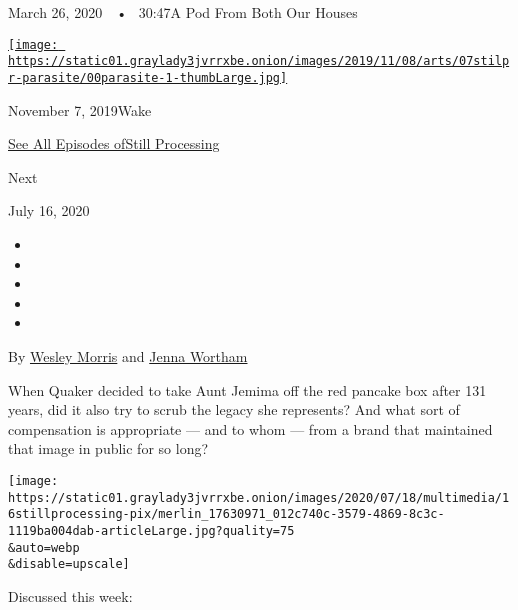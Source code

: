 March 26, 2020~~•~ 30:47A Pod From Both Our Houses

\href{https://www.nytimes3xbfgragh.onion/2019/11/07/podcasts/still-processing-parasite-watchmen-bong-joon-ho.html?action=click\&module=audio-series-bar\&region=header\&pgtype=Article}{\texttt{[image: https://static01.graylady3jvrrxbe.onion/images/2019/11/08/arts/07stilpr-parasite/00parasite-1-thumbLarge.jpg]}}

November 7, 2019Wake

\href{https://www.nytimes3xbfgragh.onion/column/still-processing-podcast}{See
All Episodes ofStill Processing}

Next

July 16, 2020

\begin{itemize}
\item
\item
\item
\item
\item
\end{itemize}

By \href{https://www.nytimes3xbfgragh.onion/by/wesley-morris}{Wesley
Morris} and
\href{https://www.nytimes3xbfgragh.onion/by/jenna-wortham}{Jenna
Wortham}

When Quaker decided to take Aunt Jemima off the red pancake box after
131 years, did it also try to scrub the legacy she represents? And what
sort of compensation is appropriate --- and to whom --- from a brand
that maintained that image in public for so long?

\texttt{[image: https://static01.graylady3jvrrxbe.onion/images/2020/07/18/multimedia/16stillprocessing-pix/merlin\_17630971\_012c740c-3579-4869-8c3c-1119ba004dab-articleLarge.jpg?quality=75\\\&auto=webp\\\&disable=upscale]}

Discussed this week:

